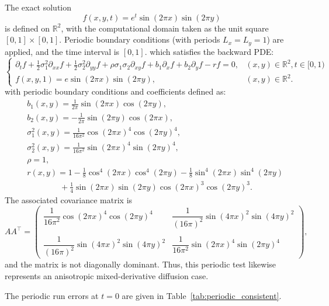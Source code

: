 \documentclass[11pt]{article}
\theoremstyle{mythm}
\theoremstyle{definition}
\begin{document}
	The exact solution  
	\[
	f(x, y, t) = e^{t} \sin(2\pi x) \sin(2\pi y)
	\]  
	is defined on $\mathbb{R}^2$, with the computational domain taken as the unit square \([0, 1] \times [0, 1]\). Periodic boundary conditions (with periods \(L_x = L_y = 1\)) are applied, and the time interval is \([0, 1]\).
	which satisfies the backward PDE:
	\begin{equation*} 
		\label{eq:exp-periodic}
		\begin{cases}
			\displaystyle
			\partial_t f + \frac{1}{2} \sigma_1^2 \partial_{xx} f + \frac{1}{2} \sigma_2^2 \partial_{yy} f + \rho \sigma_1 \sigma_2 \partial_{xy} f + b_1 \partial_x f + b_2 \partial_y f - r f = 0,&(x,y)\in\mathbb{R}^2, t\in[0,1) \\[6pt]
			f(x,y,1)=e\sin{(2\pi x)}\sin{(2\pi y)},&(x,y)\in\mathbb{R}^2.
		\end{cases}
	\end{equation*}
	with periodic boundary conditions and coefficients defined as:
	\[
	\begin{aligned}
		&b_1(x,y) = \frac{1}{2\pi}\sin(2\pi x) \cos(2\pi y), \\
		&b_2(x,y) = -\frac{1}{2\pi}\sin(2\pi y) \cos(2\pi x), \\
		&\sigma_1^2(x,y) = \frac{1}{16\pi^2} \cos(2\pi x)^4 \cos(2\pi y)^4, \\
		&\sigma_2^2(x,y) = \frac{1}{16\pi^2} \sin(2\pi x)^4 \sin(2\pi y)^4, \\
		&\rho = 1, \\
		&r(x,y) = 1 -\frac18 \cos^4(2\pi x) \cos^4(2\pi y) -\frac18 \sin^4(2\pi x) \sin^4(2\pi y)\\&\qquad\qquad +\frac14 \sin(2\pi x) \sin(2\pi y) \cos(2\pi x)^3 \cos(2\pi y)^3.
	\end{aligned}
	\]
	The associated covariance matrix is
	\[
	A A^\top =
	\begin{pmatrix}
		\dfrac{1}{16\pi^2} \cos(2\pi x)^4 \cos(2\pi y)^4 & \dfrac{1}{(16\pi)^2} \sin(4\pi x)^2 \sin(4\pi y)^2\\[2pt]
		\\
		\dfrac{1}{(16\pi)^2} \sin(4\pi x)^2 \sin(4\pi y)^2 & \dfrac{1}{16\pi^2} \sin(2\pi x)^4 \sin(2\pi y)^4
	\end{pmatrix},
	\]
	and the  matrix is not diagonally dominant. Thus, this periodic test likewise represents an anisotropic mixed-derivative diffusion case.
	
	The periodic run errors at \(t = 0\) are given in Table~\ref{tab:periodic_consistent}.
	
\end{document}
